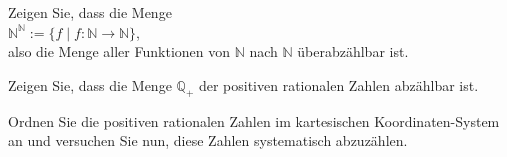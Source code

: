 \pagebreak
\exercise
Zeigen Sie, dass die Menge
\\[0.2cm]
\hspace*{1.3cm}
$\mathbb{N}^\mathbb{N} := \{ f \mid f: \mathbb{N} \rightarrow \mathbb{N} \}$,
\\[0.2cm]
also die Menge aller Funktionen von $\mathbb{N}$ nach $\mathbb{N}$ \"{u}berabz\"{a}hlbar ist.
\exend

\exercise
Zeigen Sie, dass die Menge $\mathbb{Q}_+$ der positiven rationalen Zahlen abz\"{a}hlbar ist.

\hint
Ordnen Sie die positiven rationalen Zahlen im kartesischen Koordinaten-System an und versuchen Sie
nun, diese Zahlen systematisch abzuz\"{a}hlen.
\exend


